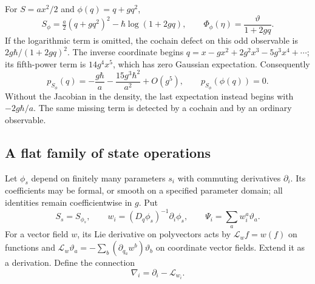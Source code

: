 For $S=ax^2/2$ and $\phi(q)=q+gq^2$,
\begin{equation}\label{eq:vol2-nonlinear-jacobian}
 S_\phi=\tfrac a2(q+gq^2)^2-\hbar\log(1+2gq),
 \qquad
 \Phi_\phi(\eta)=\frac{\vartheta}{1+2gq}.
\end{equation}
If the logarithmic term is omitted, the cochain defect on
this odd observable is $2g\hbar/(1+2gq)^2$.
The inverse coordinate begins
$q=x-gx^2+2g^2x^3-5g^3x^4+\cdots$; its fifth-power term
is $14g^4x^5$, which has zero Gaussian expectation.
Consequently
\[
 p_{S_\phi}(q)=-\frac{g\hbar}{a}
                 -\frac{15g^3\hbar^2}{a^2}+O(g^5),
 \qquad p_{S_\phi}(\phi(q))=0.
\]
Without the Jacobian in the density, the last expectation
instead begins with $-2g\hbar/a$. The same missing term
is detected by a cochain and by an ordinary observable.

\subsection{A flat family of state operations}

Let $\phi_s$ depend on finitely many parameters $s_i$ with
commuting derivatives $\partial_i$. Its coefficients may be
formal, or smooth on a specified parameter domain; all
identities remain coefficientwise in $g$. Put
\[
 S_s=S_{\phi_s},\qquad
 w_i=(D_q\phi_s)^{-1}\partial_i\phi_s,
 \qquad \Psi_i=\sum_a w_i^a\vartheta_a.
\]
For a vector field $w$, its Lie derivative on polyvectors
acts by $\mathcal L_w f=w(f)$ on functions and
$\mathcal L_w\vartheta_a=-\sum_b(\partial_{q_a}w^b)\vartheta_b$
on coordinate vector fields. Extend it as a derivation.
Define the connection
\[
 \nabla_i=\partial_i-\mathcal L_{w_i}.
\]

